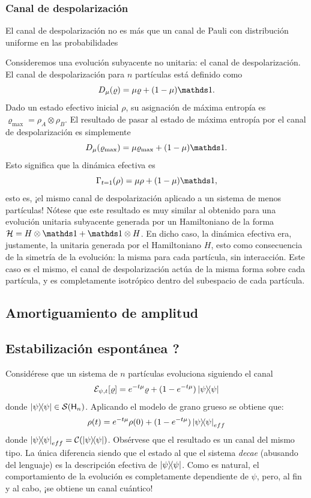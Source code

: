 \subsubsection{Canal de despolarización}

El canal de despolarización no es más que un canal de Pauli con distribución uniforme en las probabilidades 

Consideremos una evolución subyacente no unitaria: el canal de despolarización. El canal de despolarización para $n$ partículas está definido como
\begin{equation*}
    D_{\mu}(\varrho)=\mu\varrho+(1-\mu)\Id.
\end{equation*}
Dado un estado efectivo inicial $\rho$, su asignación de máxima entropía es $\varrho_{\max}=\rho_{A}\otimes\rho_{B}$. El resultado de pasar al estado de máxima entropía por el canal de despolarización es simplemente
\begin{equation*}
    D_{\mu}(\varrho_{\max})=\mu\varrho_{\max}+(1-\mu)\Id.
\end{equation*}
Esto significa que la dinámica efectiva es
\begin{equation*}
    \Gamma_{t=1}(\rho)=\mu\rho+(1-\mu)\Id,
\end{equation*}
esto es, ¡el mismo canal de despolarización aplicado a un sistema de menos partículas! Nótese que este resultado es muy similar al obtenido para una evolución unitaria subyacente generada por un Hamiltoniano de la forma $\mcH=H\otimes\Id+\Id\otimes H$. En dicho caso, la dinámica efectiva era, justamente, la unitaria generada por el Hamiltoniano $H$, esto como consecuencia de la simetría de la evolución: la misma para cada partícula, sin interacción. Este caso es el mismo, el canal de despolarización actúa de la misma forma sobre cada partícula, y es completamente isotrópico dentro del subespacio de cada partícula.

\subsection{Amortiguamiento de amplitud}

\subsection{Estabilización espontánea ?}
Considérese que un sistema de $n$ partículas evoluciona siguiendo el canal
\begin{equation*}
    \mcE_{\psi,t}[\varrho]=e^{-t\mu}\varrho+(1-e^{-t \mu})\dyad{\psi}
\end{equation*}
donde $\dyad{\psi}\in \densityspace{n}$. Aplicando el modelo de grano grueso se obtiene que:
\begin{equation*}
    \rho(t)=e^{-t\mu}\rho(0)+(1-e^{-t \mu})\dyad{\psi}_{eff}
\end{equation*}
donde $\dyad{\psi}_{eff}=\mcC(\dyad{\psi})$. Obsérvese que el resultado es un canal del mismo tipo. La única diferencia siendo que el estado al que el sistema \textit{decae} (abusando del lenguaje) es la descripción efectiva de $\dyad{\psi}$. Como es natural, el comportamiento de la evolución es completamente dependiente de $\psi$, pero, al fin y al cabo, ¡se obtiene un canal cuántico!

